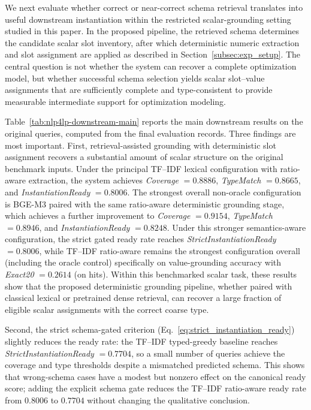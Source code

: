 \documentclass[pdflatex,sn-basic,Numbered]{sn-jnl}
\begin{document}
We next evaluate whether correct or near-correct schema retrieval translates into useful downstream instantiation within the restricted scalar-grounding setting studied in this paper. In the proposed pipeline, the retrieved schema determines the candidate scalar slot inventory, after which deterministic numeric extraction and slot assignment are applied as described in Section~\ref{subsec:exp_setup}. The central question is not whether the system can recover a complete optimization model, but whether successful schema selection yields scalar slot--value assignments that are sufficiently complete and type-consistent to provide measurable intermediate support for optimization modeling.

Table~\ref{tab:nlp4lp-downstream-main} reports the main downstream results on the original queries, computed from the final evaluation records. Three findings are most important. First, retrieval-assisted grounding with deterministic slot assignment recovers a substantial amount of scalar structure on the original benchmark inputs. Under the principal TF--IDF lexical configuration with ratio-aware extraction, the system achieves \textit{Coverage} $=0.8886$, \textit{TypeMatch} $=0.8665$, and \textit{InstantiationReady} $=0.8006$. The strongest overall non-oracle configuration is BGE-M3 paired with the same ratio-aware deterministic grounding stage, which achieves a further improvement to \textit{Coverage} $=0.9154$, \textit{TypeMatch} $=0.8946$, and \textit{InstantiationReady} $=0.8248$. Under this stronger semantics-aware configuration, the strict gated ready rate reaches \textit{StrictInstantiationReady} $=0.8006$, while TF--IDF ratio-aware remains the strongest configuration overall (including the oracle control) specifically on value-grounding accuracy with \textit{Exact20} $=0.2614$ (on hits). Within this benchmarked scalar task, these results show that the proposed deterministic grounding pipeline, whether paired with classical lexical or pretrained dense retrieval, can recover a large fraction of eligible scalar assignments with the correct coarse type.

Second, the strict schema-gated criterion (Eq.~\eqref{eq:strict_instantiation_ready}) slightly reduces the ready rate: the TF--IDF typed-greedy baseline reaches \textit{StrictInstantiationReady} $=0.7704$, so a small number of queries achieve the coverage and type thresholds despite a mismatched predicted schema. This shows that wrong-schema cases have a modest but nonzero effect on the canonical ready score; adding the explicit schema gate reduces the TF--IDF ratio-aware ready rate from $0.8006$ to $0.7704$ without changing the qualitative conclusion.
\end{document}
